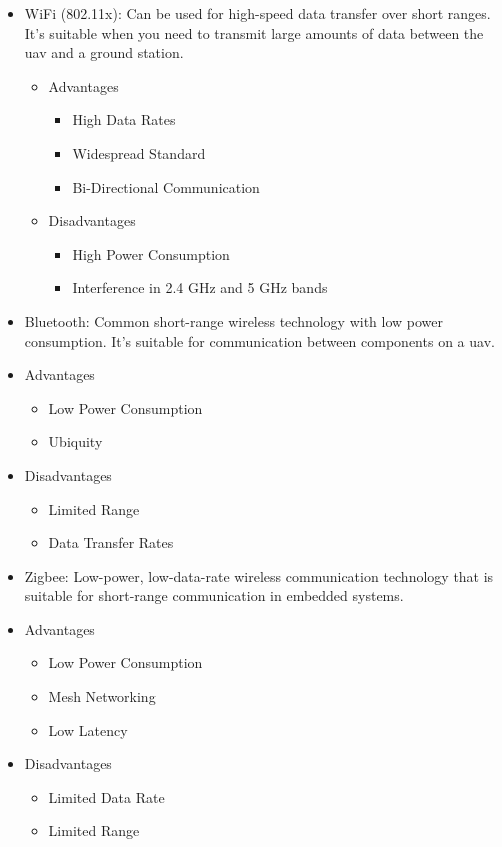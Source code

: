 \begin{itemize}
    \item WiFi (802.11x): Can be used for high-speed data transfer over short ranges. It's suitable when you need to transmit large amounts of data between the \gls{uav} and a ground station.
        \begin{itemize}
            \item Advantages
                \begin{itemize}
                    \item High Data Rates
                    \item Widespread Standard
                    \item Bi-Directional Communication
                \end{itemize}
            \item Disadvantages 
                \begin{itemize}     
                    \item High Power Consumption
                    \item Interference in 2.4 GHz and 5 GHz bands
                \end{itemize}
        \end{itemize}
        
\item Bluetooth: Common short-range wireless technology with low power consumption. It's suitable for communication between components on a \gls{uav}.
    \item Advantages 
        \begin{itemize}
            \item Low Power Consumption
            \item Ubiquity
        \end{itemize}
    \item Disadvantages 
        \begin{itemize}
            \item Limited Range
            \item Data Transfer Rates
        \end{itemize}
        
\item Zigbee: Low-power, low-data-rate wireless communication technology that is suitable for short-range communication in embedded systems.
    \item Advantages 
        \begin{itemize}
            \item Low Power Consumption
            \item Mesh Networking
            \item Low Latency
        \end{itemize}
    \item Disadvantages
        \begin{itemize}
            \item Limited Data Rate
            \item Limited Range
        \end{itemize}
        

\end{itemize}
